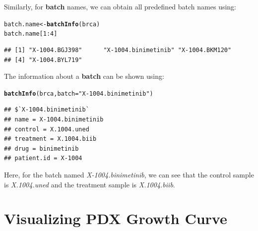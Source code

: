 \documentclass{article}\usepackage[]{graphicx}\usepackage[]{xcolor}
\makeatletter
\newcommand{\hlnum}[1]{\textcolor[rgb]{0.686,0.059,0.569}{#1}}%
\newcommand{\hlstr}[1]{\textcolor[rgb]{0.192,0.494,0.8}{#1}}%
\newcommand{\hlopt}[1]{\textcolor[rgb]{0,0,0}{#1}}%
\newcommand{\hlstd}[1]{\textcolor[rgb]{0.345,0.345,0.345}{#1}}%
\newcommand{\hlkwb}[1]{\textcolor[rgb]{0.69,0.353,0.396}{#1}}%
\newcommand{\hlkwc}[1]{\textcolor[rgb]{0.333,0.667,0.333}{#1}}%
\newcommand{\hlkwd}[1]{\textcolor[rgb]{0.737,0.353,0.396}{\textbf{#1}}}%
\newenvironment{kframe}{%
 \def\at@end@of@kframe{}%
 \ifinner\ifhmode%
  \def\at@end@of@kframe{\end{minipage}}%
  \begin{minipage}{\columnwidth}%
 \fi\fi%
 \def\FrameCommand##1{\hskip\@totalleftmargin \hskip-\fboxsep
 \colorbox{shadecolor}{##1}\hskip-\fboxsep
     \hskip-\linewidth \hskip-\@totalleftmargin \hskip\columnwidth}%
 \MakeFramed {\advance\hsize-\width
   \@totalleftmargin\z@ \linewidth\hsize
   \@setminipage}}%
 {\par\unskip\endMakeFramed%
 \at@end@of@kframe}
\newenvironment{knitrout}{}{} %
\makeatother
\begin{document}
Similarly, for \textbf{batch} names, we can obtain all predefined batch names using:

\begin{knitrout}
\color{fgcolor}\begin{kframe}
\begin{alltt}
\hlstd{batch.name} \hlkwb{<-} \hlkwd{batchInfo}\hlstd{(brca)}
\hlstd{batch.name[}\hlnum{1}\hlopt{:}\hlnum{4}\hlstd{]}
\end{alltt}
\begin{verbatim}
## [1] "X-1004.BGJ398"      "X-1004.binimetinib" "X-1004.BKM120"     
## [4] "X-1004.BYL719"
\end{verbatim}
\end{kframe}
\end{knitrout}

The information about a \textbf{batch} can be shown using:
\begin{knitrout}
\color{fgcolor}\begin{kframe}
\begin{alltt}
\hlkwd{batchInfo}\hlstd{(brca,} \hlkwc{batch} \hlstd{=} \hlstr{"X-1004.binimetinib"}\hlstd{)}
\end{alltt}
\begin{verbatim}
## $`X-1004.binimetinib`
## name = X-1004.binimetinib
## control = X.1004.uned
## treatment = X.1004.biib
## drug = binimetinib
## patient.id = X-1004
\end{verbatim}
\end{kframe}
\end{knitrout}
Here, for the batch named \textit{X-1004.binimetinib}, we can see that the control sample is \textit{X.1004.uned} and the treatment sample is \textit{X.1004.biib}.



\section{Visualizing PDX Growth Curve}
\end{document}
